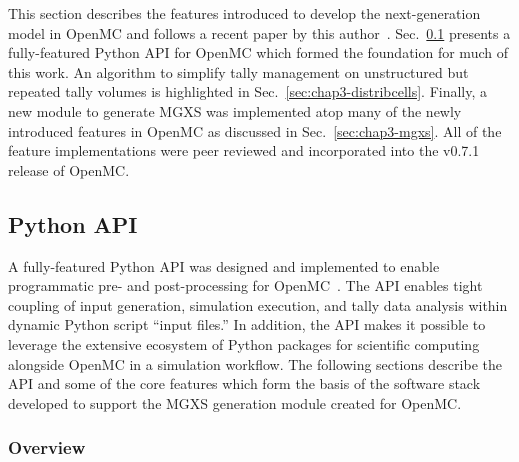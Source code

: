 

This section describes the features introduced to develop the next-generation model in OpenMC and follows a recent paper by this author~\cite{boyd2016bigdata}. Sec.~\ref{sec:chap3-py-api} presents a fully-featured Python \ac{API} for OpenMC which formed the foundation for much of this work. An algorithm to simplify tally management on unstructured but repeated tally volumes is highlighted in Sec.~\ref{sec:chap3-distribcells}. Finally, a new module to generate \ac{MGXS} was implemented atop many of the newly introduced features in OpenMC as discussed in Sec.~\ref{sec:chap3-mgxs}. All of the feature implementations were peer reviewed and incorporated into the v0.7.1 release of OpenMC.

\subsection{Python API}
\label{sec:chap3-py-api}

A fully-featured Python \ac{API} was designed and implemented to enable programmatic pre- and post-processing for OpenMC~\cite{boyd2016bigdata}. The \ac{API} enables tight coupling of input generation, simulation execution, and tally data analysis within dynamic Python script ``input files.'' In addition, the \ac{API} makes it possible to leverage the extensive ecosystem of Python packages for scientific computing alongside OpenMC in a simulation workflow. The following sections describe the \ac{API} and some of the core features which form the basis of the software stack developed to support the \ac{MGXS} generation module created for OpenMC.

\subsubsection{Overview}
\label{sec:chap3-py-api-overview}

